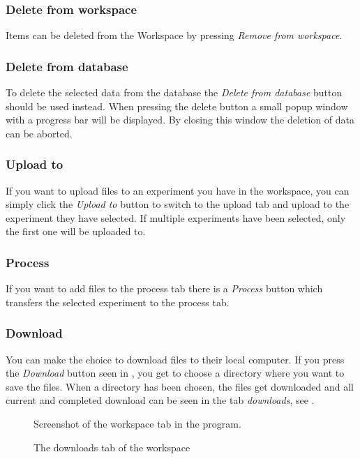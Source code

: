 \subsubsection{Delete from workspace}
Items can be deleted from the Workspace by pressing \textit{Remove from workspace}.
\subsubsection{Delete from database}
To delete the selected data from the database the \textit{Delete from database} button should be used instead. When pressing the delete button a small popup window with a progress bar will be displayed. By closing this window the deletion of data can be aborted.
\subsubsection{Upload to}
If you want to upload files to an experiment you have in the workspace, you can simply click the \textit{Upload to} button to switch to the upload tab and upload to the experiment they have selected. If multiple experiments have been selected, only the first one will be uploaded to.
\subsubsection{Process}
If you want to add files to the process tab there is a \textit{Process} button which transfers the selected experiment to the process tab.
\subsubsection{Download}
You can make the choice to download files to their local computer. If you press the \emph{Download} button seen in , you get to choose a directory where you want to save the files. When a directory has been chosen, the files get downloaded and all current and completed download can be seen in the tab \emph{downloads}, see .
\begin{figure}[htb]
	\caption{Screenshot of the workspace tab in the program.}
	\label{fig:des_workspace-view}
\end{figure}
\begin{figure}[htb]
	\caption{The downloads tab of the workspace}
	\label{fig:des_download-view}
\end{figure}
\FloatBarrier

